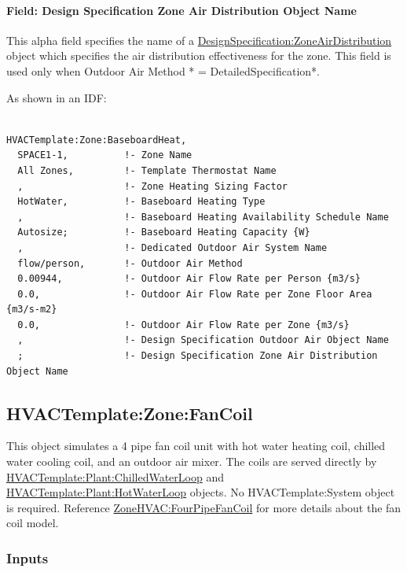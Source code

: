 \paragraph{Field: Design Specification Zone Air Distribution Object Name}\label{field-design-specification-zone-air-distribution-object-name-000}

This alpha field specifies the name of a \hyperref[designspecificationzoneairdistribution]{DesignSpecification:ZoneAirDistribution} object which specifies the air distribution effectiveness for the zone. This field is used only when Outdoor Air Method * = DetailedSpecification*.

As shown in an IDF:

\begin{lstlisting}

HVACTemplate:Zone:BaseboardHeat,
  SPACE1-1,          !- Zone Name
  All Zones,         !- Template Thermostat Name
  ,                  !- Zone Heating Sizing Factor
  HotWater,          !- Baseboard Heating Type
  ,                  !- Baseboard Heating Availability Schedule Name
  Autosize;          !- Baseboard Heating Capacity {W}
  ,                  !- Dedicated Outdoor Air System Name
  flow/person,       !- Outdoor Air Method
  0.00944,           !- Outdoor Air Flow Rate per Person {m3/s}
  0.0,               !- Outdoor Air Flow Rate per Zone Floor Area {m3/s-m2}
  0.0,               !- Outdoor Air Flow Rate per Zone {m3/s}
  ,                  !- Design Specification Outdoor Air Object Name
  ;                  !- Design Specification Zone Air Distribution Object Name
\end{lstlisting}

\subsection{HVACTemplate:Zone:FanCoil}\label{hvactemplatezonefancoil}

This object simulates a 4 pipe fan coil unit with hot water heating coil, chilled water cooling coil, and an outdoor air mixer. The coils are served directly by \hyperref[hvactemplateplantchilledwaterloop]{HVACTemplate:Plant:ChilledWaterLoop} and \hyperref[hvactemplateplanthotwaterloop]{HVACTemplate:Plant:HotWaterLoop} objects. No HVACTemplate:System object is required. Reference \hyperref[zonehvacfourpipefancoil]{ZoneHVAC:FourPipeFanCoil} for more details about the fan coil model.

\subsubsection{Inputs}\label{inputs-3-018}

